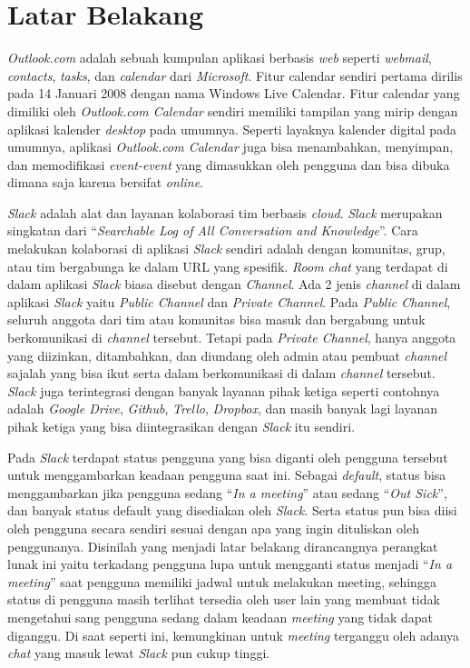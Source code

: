\documentclass[a4paper,twoside]{article}
\begin{document}
\section{Latar Belakang}
\textit{Outlook.com} adalah sebuah kumpulan aplikasi berbasis \textit{web} seperti \textit{webmail}, \textit{contacts}, \textit{tasks}, dan \textit{calendar} dari \textit{Microsoft}. Fitur calendar sendiri pertama dirilis pada 14 Januari 2008 dengan nama Windows Live Calendar. Fitur calendar yang dimiliki oleh \textit{Outlook.com Calendar} sendiri memiliki tampilan yang mirip dengan aplikasi kalender \textit{desktop} pada umumnya. Seperti layaknya kalender digital pada umumnya, aplikasi \textit{Outlook.com Calendar} juga bisa menambahkan, menyimpan, dan memodifikasi \textit{event-event} yang dimasukkan oleh pengguna dan bisa dibuka dimana saja karena bersifat \textit{online}. 

\textit{Slack} adalah alat dan layanan kolaborasi tim berbasis \textit{cloud}. \textit{Slack} merupakan singkatan dari ``\textit{Searchable Log of All Conversation and Knowledge}''. Cara melakukan kolaborasi di aplikasi \textit{Slack} sendiri adalah dengan komunitas, grup, atau tim bergabunga ke dalam URL yang spesifik. \textit{Room chat} yang terdapat di dalam aplikasi \textit{Slack} biasa disebut dengan \textit{Channel}. Ada 2 jenis \textit{channel} di dalam aplikasi \textit{Slack} yaitu \textit{Public Channel} dan \textit{Private Channel}. Pada \textit{Public Channel}, seluruh anggota dari tim atau komunitas bisa masuk dan bergabung untuk berkomunikasi di \textit{channel} tersebut. Tetapi pada \textit{Private Channel}, hanya anggota yang diizinkan, ditambahkan, dan diundang oleh admin atau pembuat \textit{channel} sajalah yang bisa ikut serta dalam berkomunikasi di dalam \textit{channel} tersebut. \textit{Slack} juga terintegrasi dengan banyak layanan pihak ketiga seperti contohnya adalah \textit{Google Drive}, \textit{Github}, \textit{Trello}, \textit{Dropbox}, dan masih banyak lagi layanan pihak ketiga yang bisa diintegrasikan dengan \textit{Slack} itu sendiri. 

Pada \textit{Slack} terdapat status pengguna yang bisa diganti oleh pengguna tersebut untuk menggambarkan keadaan pengguna saat ini. Sebagai \textit{default}, status bisa menggambarkan jika pengguna sedang ``\textit{In a meeting}'' atau sedang ``\textit{Out Sick}'', dan banyak status default yang disediakan oleh \textit{Slack}. Serta status pun bisa diisi oleh pengguna secara sendiri sesuai dengan apa yang ingin dituliskan oleh penggunanya. Disinilah yang menjadi latar belakang dirancangnya perangkat lunak ini yaitu terkadang pengguna lupa untuk mengganti status menjadi ``\textit{In a meeting}'' saat pengguna memiliki jadwal untuk melakukan meeting, sehingga status di pengguna masih terlihat tersedia oleh user lain yang membuat tidak mengetahui sang pengguna sedang dalam keadaan \textit{meeting} yang tidak dapat diganggu. Di saat seperti ini, kemungkinan untuk \textit{meeting} terganggu oleh adanya \textit{chat} yang masuk lewat \textit{Slack} pun cukup tinggi. 
\end{document}
